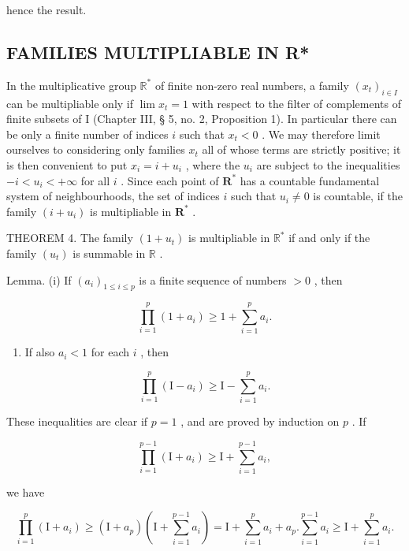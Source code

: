 hence the result.

\subsection{FAMILIES MULTIPLIABLE IN R*}

In the multiplicative group \(\mathbb{R}^*\) of finite non-zero real numbers, a family \((x_{t})_{i\in I}\) can be multipliable only if \(\lim x_{t} = 1\) with respect to the filter of complements of finite subsets of I (Chapter III, § 5, no. 2, Proposition 1). In particular there can be only a finite number of indices \(i\) such that \(x_{t} < 0\) . We may therefore limit ourselves to considering only families \(x_{t}\) all of whose terms are strictly positive; it is then convenient to put \(x_{i} = i + u_{i}\) , where the \(u_{i}\) are subject to the inequalities \(-i < u_{i} < +\infty\) for all \(i\) . Since each point of \(\mathbf{R}^*\) has a countable fundamental system of neighbourhoods, the set of indices \(i\) such that \(u_{i} \neq 0\) is countable, if the family \((i + u_{i})\) is multipliable in \(\mathbf{R}^*\) .

THEOREM 4. The family \((1 + u_{t})\) is multipliable in \(\mathbb{R}^*\) if and only if the family \((u_{t})\) is summable in \(\mathbb{R}\) .

Lemma. (i) If \((a_{i})_{1\leqslant i\leqslant p}\) is a finite sequence of numbers \(>0\) , then

\[
\prod_ {i = 1} ^ {p} \left(1 + a _ {i}\right) \geqslant 1 + \sum_ {i = 1} ^ {p} a _ {i}.\tag{2}
\]

\begin{enumerate}
\def\labelenumi{(\roman{enumi})}
\setcounter{enumi}{1}
\tightlist
\item
  If also \(a_i < 1\) for each \(i\) , then
\end{enumerate}

\[
\prod_ {i = 1} ^ {p} \left(\mathrm{I} - a _ {i}\right) \geqslant \mathrm{I} - \sum_ {i = 1} ^ {p} a _ {i}.\tag{3}
\]

These inequalities are clear if \(p = 1\) , and are proved by induction on \(p\) . If

\[
\prod_ {i = 1} ^ {p - 1} \left(\mathrm{I} + a _ {i}\right) \geqslant \mathrm{I} + \sum_ {i = 1} ^ {p - 1} a _ {i},
\]

we have

\[
\prod_ {i = 1} ^ {p} \left(\mathrm{I} + a _ {i}\right) \geqslant \left(\mathrm{I} + a _ {p}\right) \left(\mathrm{I} + \sum_ {i = 1} ^ {p - 1} a _ {i}\right) = \mathrm{I} + \sum_ {i = 1} ^ {p} a _ {i} + a _ {p}. \sum_ {i = 1} ^ {p - 1} a _ {i} \geqslant \mathrm{I} + \sum_ {i = 1} ^ {p} a _ {i}.
\]

